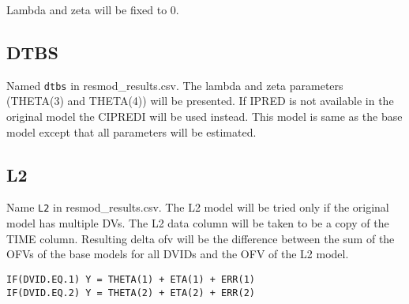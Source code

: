 Lambda and zeta will be fixed to 0.

\subsection{DTBS}
Named \verb|dtbs| in resmod\_results.csv. The lambda and zeta parameters (THETA(3) and THETA(4)) will be presented. If IPRED is not available in the original model the CIPREDI will be used instead. This model is same as the base model except that all parameters will be estimated.

\subsection{L2}
Name \verb|L2| in resmod\_results.csv. The L2 model will be tried only if the original model has multiple DVs. The L2 data column will be taken to be a copy of the TIME column. Resulting delta ofv will be the difference between the sum of the OFVs of the base models for all DVIDs and the OFV of the L2 model.
\begin{verbatim}
IF(DVID.EQ.1) Y = THETA(1) + ETA(1) + ERR(1)
IF(DVID.EQ.2) Y = THETA(2) + ETA(2) + ERR(2)
\end{verbatim}



